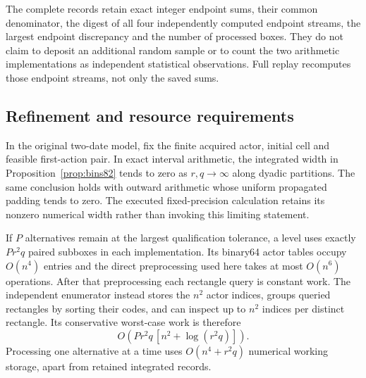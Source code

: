 The complete records retain exact integer endpoint sums, their common denominator, the digest of all four independently computed endpoint streams, the largest endpoint discrepancy and the number of processed boxes. They do not claim to deposit an additional random sample or to count the two arithmetic implementations as independent statistical observations. Full replay recomputes those endpoint streams, not only the saved sums.

\subsection{Refinement and resource requirements}
\begin{proposition}\label{prop:refinement82}
In the original two-date model, fix the finite acquired actor, initial cell and feasible first-action pair. In exact interval arithmetic, the integrated width in Proposition~\ref{prop:bins82} tends to zero as $r,q\to\infty$ along dyadic partitions. The same conclusion holds with outward arithmetic whose uniform propagated padding tends to zero. The executed fixed-precision calculation retains its nonzero numerical width rather than invoking this limiting statement.

If $P$ alternatives remain at the largest qualification tolerance, a level uses exactly $Pr^2q$ paired subboxes in each implementation. Its binary64 actor tables occupy $O(n^4)$ entries and the direct preprocessing used here takes at most $O(n^6)$ operations. After that preprocessing each rectangle query is constant work. The independent enumerator instead stores the $n^2$ actor indices, groups queried rectangles by sorting their codes, and can inspect up to $n^2$ indices per distinct rectangle. Its conservative worst-case work is therefore
\[
 O\!\left(Pr^2q\,[n^2+\log(r^2q)]\right).
\]
Processing one alternative at a time uses $O(n^4+r^2q)$ numerical working storage, apart from retained integrated records.
\end{proposition}

